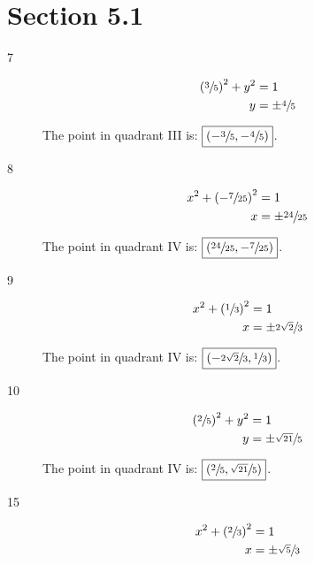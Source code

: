 \documentclass{exam}
\begin{document}
    \section{Section 5.1}
    \begin{description}

      \item[7]
        \begin{align*}
          \left( \sfrac{3}{5} \right)^2 + y^2 & = 1 \\
          y                                  & = \pm \sfrac{4}{5} \\
        \end{align*}

        The point in quadrant III is: $\boxed{ \left( -\sfrac{3}{5}, -\sfrac{4}{5} \right) }$.

      \item[8]
        \begin{align*}
          x^2 + \left( - \sfrac{7}{25} \right)^2 & = 1 \\
          x                                     & = \pm \sfrac{24}{25} \\
        \end{align*}

        The point in quadrant IV is: $\boxed{ \left( \sfrac{24}{25}, -\sfrac{7}{25} \right) }$.

      \item[9]
        \begin{align*}
          x^2 + \left( \sfrac{1}{3} \right)^2 & = 1 \\
          x                                  & = \pm \sfrac{2 \sqrt{2}}{3} \\
        \end{align*}

        The point in quadrant IV is: $\boxed{ \left( - \sfrac{2 \sqrt{2}}{3}, \sfrac{1}{3} \right) }$.

      \item[10]
        \begin{align*}
          \left( \sfrac{2}{5} \right)^2 + y^2 & = 1 \\
          y                                  & = \pm \sfrac{\sqrt{21}}{5} \\
        \end{align*}

        The point in quadrant IV is: $\boxed{ \left( \sfrac{2}{5}, \sfrac{\sqrt{21}}{5} \right) }$.

      \item[15]
        \begin{align*}
          x^2 + \left( \sfrac{2}{3} \right)^2 & = 1 \\
          x                                  & = \pm \sfrac{\sqrt{5}}{3} \\
        \end{align*}


\end{description}
\end{document}
